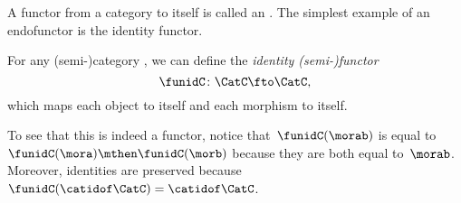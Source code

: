A functor from a category to itself is called an \emph{}.
The simplest example of an endofunctor is the identity functor.

\begin{definition}
    For any (semi-)category \CatC, we can define the \emph{identity (semi-)functor}
    \begin{equation}
        \funidC \colon \CatC \fto \CatC,
    \end{equation}
    which maps each object to itself and each morphism to itself.
\end{definition}

To see that this is indeed a functor, notice that~$\funidC(\morab)$ is equal to~$\funidC(\mora)\mthen \funidC(\morb)$ because they are both equal to~$\morab$.
Moreover, identities are preserved because~$\funidC(\catidof\CatC)=\catidof\CatC$.

